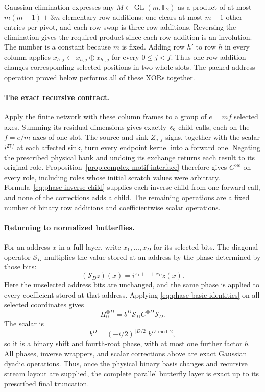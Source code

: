 \documentclass[11pt]{article}
\theoremstyle{definition}
\begin{document}
Gaussian elimination expresses any $M\in\operatorname{GL}(m,\mathbb F_2)$
as a product of at most $m(m-1)+3m$ elementary row additions: one clears
at most $m-1$ other entries per pivot, and each row swap is three row
additions.  Reversing the elimination gives the required product since
each row addition is an involution.  The number is a constant because
$m$ is fixed.  Adding row $h'$ to row $h$ in every column applies
$x_{h,j}\leftarrow x_{h,j}\mathbin\oplus x_{h',j}$ for every
$0\le j<f$.  Thus one row addition changes corresponding selected
positions in two whole slots.  The packed address operation proved
below performs all of these XORs together.

\paragraph{The exact recursive contract.}
Apply the finite network with these column frames to a group of
$e=mf$ selected axes.  Summing its residual dimensions gives exactly
$s_{\rm c}$ child calls, each on the $f=e/m$ axes of one slot.
The source and sink $Z_{a,f}$ signs, together with the scalar
$i^{27f}$ at each affected sink, turn every endpoint kernel into a
forward one.  Negating the prescribed physical bank
and undoing its exchange returns each result to its original role.
Proposition~\ref{prop:complex-motif-interface} therefore gives
$C^{\otimes e}$ on every role, including roles whose initial scratch
values were arbitrary.  Formula~\eqref{eq:phase-inverse-child} supplies
each inverse child from one forward call, and none of the corrections
adds a child.  The remaining operations are a fixed number of binary
row additions and coefficientwise scalar operations.

\paragraph{Returning to normalized butterflies.}
For an address $x$ in a full layer, write $x_1,\ldots,x_D$ for its
selected bits.
The diagonal operator $\mathcal S_D$ multiplies the value stored at
an address by the phase determined by those bits:
\[
 (\mathcal S_D z)(x)=i^{x_1+\cdots+x_D}z(x).
\]
Here the unselected address bits are unchanged, and the same phase is
applied to every coefficient stored at that address.  Applying
\eqref{eq:phase-basic-identities} on all selected coordinates gives
\begin{equation}\label{eq:phase-butterfly-layer}
 H_0^{\otimes D}=b^D\mathcal S_D C^{\otimes D}\mathcal S_D.
\end{equation}
The scalar is
\[
 b^D=(-i/2)^{\lfloor D/2\rfloor}b^{D\bmod2},
\]
so it is a binary shift and fourth-root phase, with at most one further
factor $b$.  All phases, inverse wrappers, and scalar corrections above
are exact Gaussian dyadic operations.  Thus, once the physical binary
basis changes and recursive stream layout are supplied, the complete
parallel butterfly layer is exact up to its prescribed final truncation.
\end{document}
